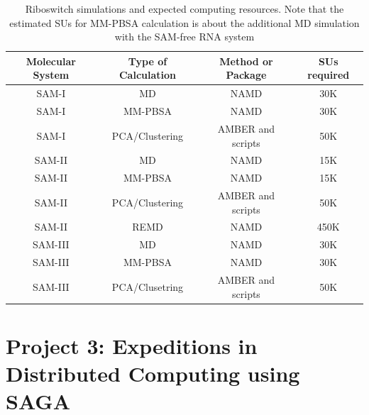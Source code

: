 \documentclass[a4paper,10pt]{article}
\begin{document}
\begin{table}[!h]
\begin{center}
  \caption{Riboswitch simulations and expected computing resources. Note that the estimated SUs for MM-PBSA calculation is about the additional MD simulation with the SAM-free RNA system}
\label{table:systems}
\begin{tabular}{| c | c | c | c |}
\hline
Molecular System & Type of Calculation &   Method or Package  &   SUs required \\
\hline
SAM-I & MD &  NAMD &  30K\\
SAM-I & MM-PBSA & NAMD & 30K \\
SAM-I & PCA/Clustering &  AMBER and scripts &  50K\\
SAM-II &MD &  NAMD &  15K\\
SAM-II & MM-PBSA & NAMD & 15K \\
SAM-II & PCA/Clustering & AMBER and scripts & 50K \\
SAM-II & REMD &  NAMD &  450K\\
SAM-III &MD &  NAMD &  30K\\
SAM-III & MM-PBSA & NAMD & 30K \\
SAM-III & PCA/Clusetring & AMBER and scripts & 50K \\
\hline
\end{tabular}
\end{center}
\end{table}


\section*{Project 3: Expeditions in Distributed Computing using SAGA}

\end{document}
